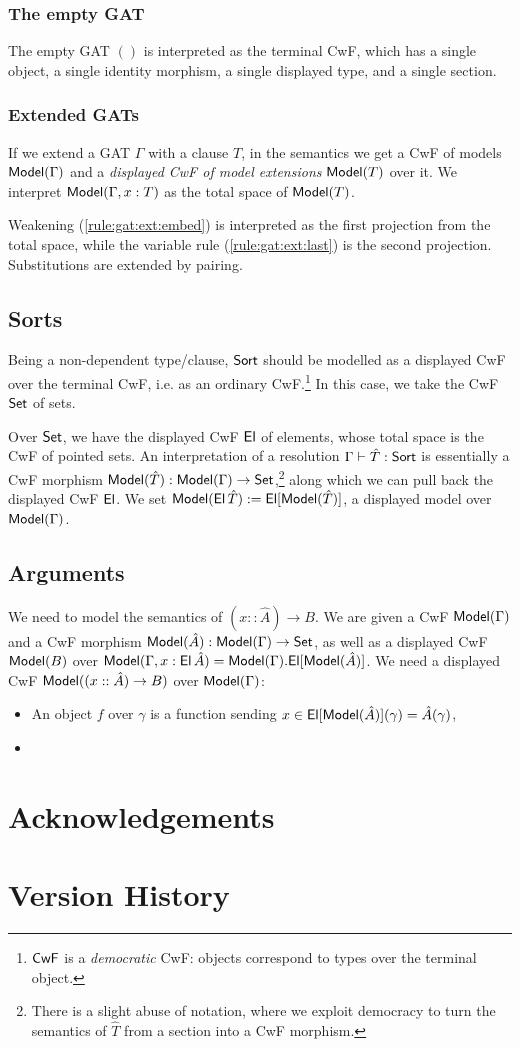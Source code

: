 \documentclass[a4paper]{article}
\begin{document}
\subsubsection{The empty GAT}
The empty GAT $()$ is interpreted as the terminal CwF, which has a single object, a single identity morphism, a single displayed type, and a single section.

\subsubsection{Extended GATs}
If we extend a GAT $\Gamma$ with a clause $T$, in the semantics we get a CwF of models ${\mathsf{Model}}(\Gamma)$ and a \emph{displayed CwF of model extensions} ${\mathsf{Model}}(T)$ over it. We interpret ${\mathsf{Model}}(\Gamma, x : T)$ as the total space of ${\mathsf{Model}}(T)$.

Weakening (\ref{rule:gat:ext:embed}) is interpreted as the first projection from the total space, while the variable rule (\ref{rule:gat:ext:last}) is the second projection. Substitutions are extended by pairing.

\subsection{Sorts}
Being a non-dependent type/clause, ${\mathsf{Sort}}$ should be modelled as a displayed CwF over the terminal CwF, i.e. as an ordinary CwF.\footnote{${\mathsf{CwF}}$ is a \emph{democratic} CwF: objects correspond to types over the terminal object.}
In this case, we take the CwF ${\mathsf{Set}}$ of sets.

Over ${\mathsf{Set}}$, we have the displayed CwF ${\mathsf{El}}$ of elements, whose total space is the CwF of pointed sets.
An interpretation of a resolution $\Gamma \vdash \hat T : {\mathsf{Sort}}$ is essentially a CwF morphism ${\mathsf{Model}}(\hat T) : {\mathsf{Model}}(\Gamma) \to {\mathsf{Set}}$,\footnote{There is a slight abuse of notation, where we exploit democracy to turn the semantics of $\hat T$ from a section into a CwF morphism.} along which we can pull back the displayed CwF ${\mathsf{El}}$.
We set ${\mathsf{Model}}({\mathsf{El}}\,\hat T) := {\mathsf{El}}[{\mathsf{Model}}(\hat T)]$, a displayed model over ${\mathsf{Model}}(\Gamma)$.

\subsection{Arguments}
We need to model the semantics of $(x :: \hat A) \to B$.
We are given a CwF ${\mathsf{Model}}(\Gamma)$ and a CwF morphism ${\mathsf{Model}}(\hat A) : {\mathsf{Model}}(\Gamma) \to {\mathsf{Set}}$, as well as a displayed CwF ${\mathsf{Model}}(B)$ over ${\mathsf{Model}}(\Gamma, x : {\mathsf{El}}\,\hat A) = {\mathsf{Model}}(\Gamma).{\mathsf{El}}[{\mathsf{Model}}(\hat A)]$.
We need a displayed CwF ${\mathsf{Model}}((x :: \hat A) \to B)$ over ${\mathsf{Model}}(\Gamma)$:
\begin{itemize}
	\item An object $f$ over $\gamma$ is a function sending $x \in {\mathsf{El}}[{\mathsf{Model}}(\hat A)](\gamma) = \hat A(\gamma)$,
	\item 
\end{itemize}

\section*{Acknowledgements}

\appendix
\section{Version History}



\end{document}
